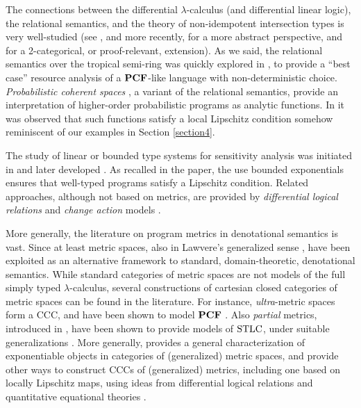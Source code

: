 
The connections between the differential $\lambda$-calculus (and differential linear logic), the relational semantics, and the theory of non-idempotent intersection types is very well-studied (see \cite{decarvalho2018}, and more recently, \cite{Mazza2016} for a more abstract perspective, and \cite{Olimpieri2021, Galal2021} for a 2-categorical, or proof-relevant, extension).
As we said, the relational semantics over the tropical semi-ring was quickly explored in \cite{Manzo2013}, to provide a ``best case'' resource analysis of a $\mathbf{PCF}$-like language with non-deterministic choice. 
\emph{Probabilistic coherent spaces} \cite{Ehrhard2011}, a variant of  the relational semantics, provide an interpretation of higher-order probabilistic programs
as analytic functions. In \cite{Ehrhard2022} it was observed that such functions satisfy a local Lipschitz condition somehow reminiscent of our examples in Section \ref{section4}.


The study of linear or bounded type systems for sensitivity analysis was initiated in \cite{Girard92tcs} and later developed \cite{Schopp, SchoppDalLago, Reed2010}.
As recalled in the paper, the use bounded exponentials ensures that well-typed programs satisfy a Lipschitz condition.
Related approaches, although not based on metrics, are provided by \emph{differential logical relations} \cite{dallago} and \emph{change action} models \cite{Picallo2019}.


More generally, the literature on program metrics in denotational semantics is vast. Since at least \cite{VANBREUGEL20011} metric spaces, also in Lawvere's generalized sense \cite{Lawvere1973}, have been exploited as an alternative framework to standard, domain-theoretic, denotational semantics. 
While standard categories of metric spaces are not models of the full simply typed $\lambda$-calculus, several constructions of cartesian closed categories of metric spaces can be found in the literature. For instance, 
\emph{ultra}-metric spaces form a CCC, and have been shown to model $\mathbf{PCF}$ \cite{Escardo1999}.
Also \emph{partial} metrics, introduced in \cite{matthews}, have been shown to provide models of $\mathrm{STLC}$, under suitable generalizations \cite{Geoffroy2020}.
More generally, \cite{Clementino2006} provides a general characterization of exponentiable objects in categories of (generalized) metric spaces, and \cite{PistoneLICS, PistoneFSCD2022} provide other ways to construct CCCs of
(generalized) metrics, including one based on locally Lipschitz maps, 
using ideas from {differential logical relations} and quantitative equational theories \cite{Plotk}.

